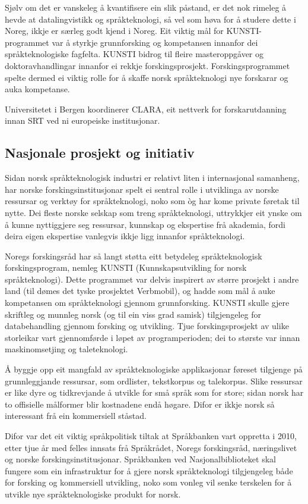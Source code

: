 \begin{multicols}{2}
Sjølv om det er vanskeleg å kvantifisere ein slik påstand, er det nok rimeleg å hevde at datalingvistikk og språkteknologi, så vel som høva for å studere dette i Noreg, ikkje er særleg godt kjend i Noreg. Eit viktig mål for KUNSTI-programmet var å styrkje grunnforsking og kompetansen innanfor dei språkteknologiske fagfelta. KUNSTI bidrog til fleire masteroppgåver og doktoravhandlingar innanfor ei rekkje forskingsprosjekt. Forskingsprogrammet spelte dermed ei viktig rolle for å skaffe norsk språkteknologi nye forskarar og auka kompetanse.

Universitetet i Bergen koordinerer CLARA, eit nettverk for forskarutdanning innan SRT ved ni europeiske institusjonar.

\subsection{Nasjonale prosjekt og initiativ}

Sidan norsk språkteknologisk industri er relativt liten i internasjonal samanheng, har norske forskingsinstitusjonar spelt ei sentral rolle i utviklinga av norske ressursar og verktøy for språkteknologi, noko som òg har kome private føretak til nytte. 
Dei fleste norske selskap som treng språkteknologi, uttrykkjer eit ynske om å kunne nyttiggjere seg ressursar, kunnskap og ekspertise frå akademia, fordi deira eigen ekspertise vanlegvis ikkje ligg innanfor språkteknologi. 

Noregs forskingsråd har så langt støtta eitt betydeleg språkteknologisk forskingsprogram, nemleg KUNSTI (Kunnskapsutvikling for norsk språkteknologi). 
Dette programmet var delvis inspirert av større prosjekt i andre land (til dømes det tyske prosjektet Verbmobil), og hadde som mål å auke kompetansen om språkteknologi gjennom grunnforsking. KUNSTI skulle gjere skriftleg og munnleg norsk (og til ein viss grad samisk) tilgjengeleg for databehandling gjennom forsking og utvikling. Tjue forskingsprosjekt av ulike storleikar vart gjennomførde i løpet av programperioden; dei to største var innan maskinomsetjing og taleteknologi.

Å byggje opp eit mangfald av språkteknologiske applikasjonar føreset tilgjenge på grunnleggjande ressursar, som ordlister, tekstkorpus og talekorpus. Slike ressursar er like dyre og tidkrevjande å utvikle for små språk som for store; sidan norsk har to offisielle målformer blir kostnadene endå høgare. 
Difor er ikkje norsk så interessant frå ein kommersiell ståstad.

Difor var det eit viktig språkpolitisk tiltak at Språkbanken vart oppretta i 2010, etter tjue år med felles innsats frå Språkrådet, Noregs forskingsråd, næringslivet og norske forskingsinstitusjonar. Språkbanken ved Nasjonalbiblioteket skal fungere som ein infrastruktur for å gjere norsk språkteknologi tilgjengeleg både for forsking og kommersiell utvikling, noko som vonleg vil senke terskelen for å utvikle nye språkteknologiske produkt for norsk. 


\end{multicols}

